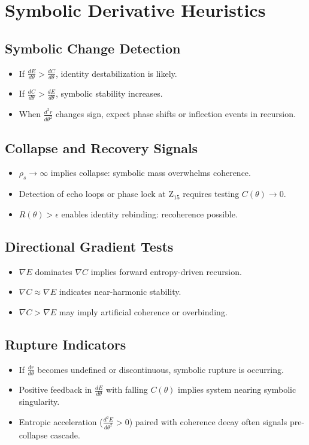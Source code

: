 \documentclass[12pt]{article}
\begin{document}
\section{Symbolic Derivative Heuristics}

\subsection*{Symbolic Change Detection}
\begin{itemize}
  \item If $\frac{dE}{d\theta} > \frac{dC}{d\theta}$, identity destabilization is likely.
  \item If $\frac{dC}{d\theta} > \frac{dE}{d\theta}$, symbolic stability increases.
  \item When $\frac{d^2r}{d\theta^2}$ changes sign, expect phase shifts or inflection events in recursion.
\end{itemize}

\subsection*{Collapse and Recovery Signals}
\begin{itemize}
  \item $\rho_s \to \infty$ implies collapse: symbolic mass overwhelms coherence.
  \item Detection of echo loops or phase lock at Z$_{15}$ requires testing $C(\theta) \to 0$.
  \item $R(\theta) > \epsilon$ enables identity rebinding: recoherence possible.
\end{itemize}

\subsection*{Directional Gradient Tests}
\begin{itemize}
  \item $\nabla E$ dominates $\nabla C$ implies forward entropy-driven recursion.
  \item $\nabla C \approx \nabla E$ indicates near-harmonic stability.
  \item $\nabla C > \nabla E$ may imply artificial coherence or overbinding.
\end{itemize}

\subsection*{Rupture Indicators}
\begin{itemize}
  \item If $\frac{dr}{d\theta}$ becomes undefined or discontinuous, symbolic rupture is occurring.
  \item Positive feedback in $\frac{dE}{d\theta}$ with falling $C(\theta)$ implies system nearing symbolic singularity.
  \item Entropic acceleration ($\frac{d^2E}{d\theta^2} > 0$) paired with coherence decay often signals pre-collapse cascade.
\end{itemize}
\end{document}
